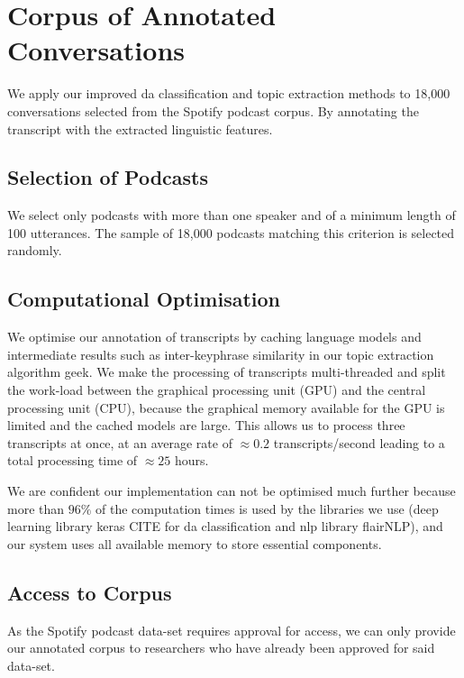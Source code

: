 {\let\clearpage\relax \chapter[Annotated Corpus]{Corpus of Annotated Conversations}}

We apply our improved \gls{da} classification and topic extraction methods to 18,000 conversations selected from the Spotify podcast corpus\cite{clifton-2020100000}. By annotating the transcript with the extracted linguistic features.

\section{Selection of Podcasts}
We select only podcasts with more than one speaker and of a minimum length of 100 \glspl{utterance}. The sample of 18,000 podcasts matching this criterion is selected randomly.

\section{Computational Optimisation}
We optimise our annotation of transcripts by caching language \glspl{model} and intermediate results such as inter-\gls{keyphrase} similarity in our topic extraction algorithm \gls{geek}.
We make the processing of transcripts multi-threaded and split the work-load between the graphical processing unit (GPU) and the central processing unit (CPU), because the graphical memory available for the GPU is limited and the cached \glspl{model} are large. This allows us to process three transcripts at once, at an average rate of $\approx 0.2$ transcripts/second leading to a total processing time of $\approx 25$ hours.

We are confident our implementation can not be optimised much further because more than $96\%$ of the computation times is used by the libraries we use (deep learning library keras CITE for \gls{da} classification and \gls{nlp} library flairNLP\cite{flairNLP}), and our system uses all available memory to store essential components.

\section{Access to Corpus}

As the Spotify podcast data-set requires approval for access, we can only provide our annotated corpus to researchers who have already been approved for said data-set. \newline
